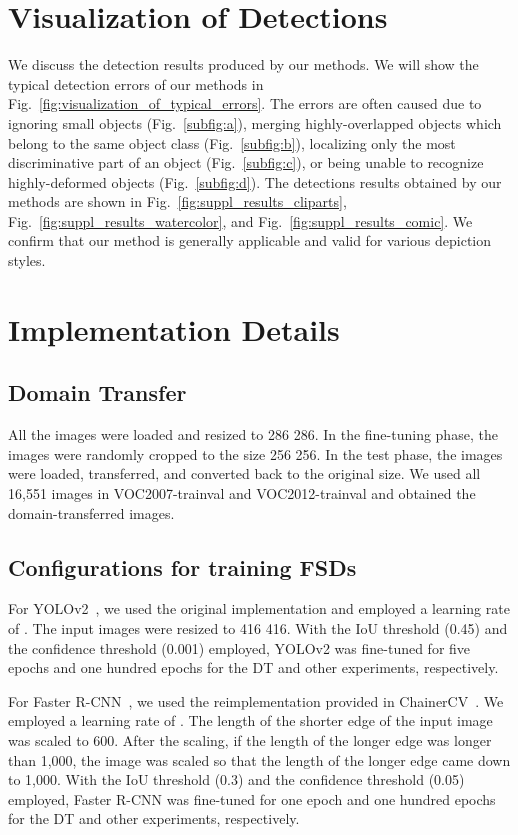 \documentclass[10pt,twocolumn,letterpaper]{article}
\newcommand{\Fref}[1]{Fig.~\ref{#1}}
\begin{document}
\section{Visualization of Detections}
We discuss the detection results produced by our methods.
We will show the typical detection errors of our methods in \Fref{fig:visualization_of_typical_errors}.
The errors are often caused due to ignoring small objects (\Fref{subfig:a}), merging highly-overlapped objects which belong to the same object class (\Fref{subfig:b}), localizing only the most discriminative part of an object (\Fref{subfig:c}), or being unable to recognize highly-deformed objects (\Fref{subfig:d}).
The detections results obtained by our methods are shown in \Fref{fig:suppl_results_cliparts}, \Fref{fig:suppl_results_watercolor}, and \Fref{fig:suppl_results_comic}.
We confirm that our method is generally applicable and valid for various depiction styles.


\section{Implementation Details}

\subsection{Domain Transfer}
All the images were loaded and resized to 286  286.
In the fine-tuning phase, the images were randomly cropped to the size 256  256.
In the test phase, the images were loaded, transferred, and converted back to the original size.
We used all 16,551 images in VOC2007-trainval and VOC2012-trainval and obtained the domain-transferred images.

\subsection{Configurations for training FSDs}
For YOLOv2~\cite{redmon2016yolo9000}, we used the original implementation and employed a learning rate of .
The input images were resized to 416  416.
With the IoU threshold (0.45) and the confidence threshold (0.001) employed, YOLOv2 was fine-tuned for five epochs and one hundred epochs for the DT and other experiments, respectively.

For Faster R-CNN~\cite{ren2015faster}, we used the reimplementation provided in ChainerCV~\cite{ChainerCV2017}.
We employed a learning rate of .
The length of the shorter edge of the input image was scaled to 600.
After the scaling, if the length of the longer edge was longer than 1,000, the image was scaled so that the length of the longer edge came down to 1,000.
With the IoU threshold (0.3) and the confidence threshold (0.05) employed,
Faster R-CNN was fine-tuned for one epoch and one hundred epochs for the DT and other experiments, respectively.
\end{document}
